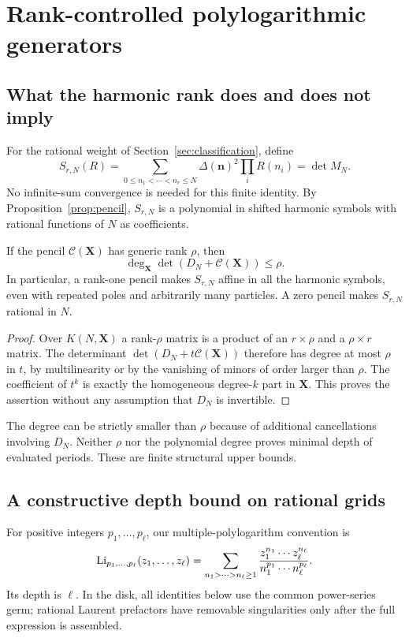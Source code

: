 \section{Rank-controlled polylogarithmic generators}
\label{sec:polylogs}

\subsection{What the harmonic rank does and does not imply}
For the rational weight of Section~\ref{sec:classification}, define
\[
 S_{r,N}(R)=\sum_{0\le n_1<\cdots<n_r\le N}
             \Delta(\bm n)^2\prod_iR(n_i)=\det M_N.
\]
No infinite-sum convergence is needed for this finite identity.
By Proposition~\ref{prop:pencil}, $S_{r,N}$ is a polynomial in
shifted harmonic symbols with rational functions of $N$ as coefficients.

\begin{proposition}\label{prop:degree}
If the pencil $\mathscr C(\bm X)$ has generic rank $\rho$, then
\begin{equation}\label{eq:degree-bound}
 \deg_{\bm X}\det(D_N+\mathscr C(\bm X))\le\rho.
\end{equation}
In particular, a rank-one pencil makes $S_{r,N}$ affine in all the
harmonic symbols, even with repeated poles and arbitrarily many particles.
A zero pencil makes $S_{r,N}$ rational in $N$.
\end{proposition}
\begin{proof}
Over $K(N,\bm X)$ a rank-$\rho$ matrix is a product of an $r\times\rho$
and a $\rho\times r$ matrix. The determinant
$\det(D_N+t\mathscr C(\bm X))$ therefore has degree at most $\rho$
in $t$, by multilinearity or by the vanishing of minors of order
larger than $\rho$. The coefficient of $t^k$ is exactly the
homogeneous degree-$k$ part in $\bm X$. This proves the assertion
without any assumption that $D_N$ is invertible.
\end{proof}

The degree can be strictly smaller than $\rho$ because of additional
cancellations involving $D_N$. Neither $\rho$ nor the polynomial degree
proves minimal depth of evaluated periods. These are finite structural
upper bounds.

\subsection{A constructive depth bound on rational grids}
For positive integers $p_1,\ldots,p_\ell$, our multiple-polylogarithm
convention is
\begin{equation}\label{eq:MPL}
 \operatorname{Li}_{p_1,\ldots,p_\ell}(z_1,\ldots,z_\ell)
 =\sum_{n_1>\cdots>n_\ell\ge1}
   \frac{z_1^{n_1}\cdots z_\ell^{n_\ell}}
        {n_1^{p_1}\cdots n_\ell^{p_\ell}}.
\end{equation}
Its depth is $\ell$. In the disk, all identities below use the
common power-series germ; rational Laurent prefactors have removable
singularities only after the full expression is assembled.

